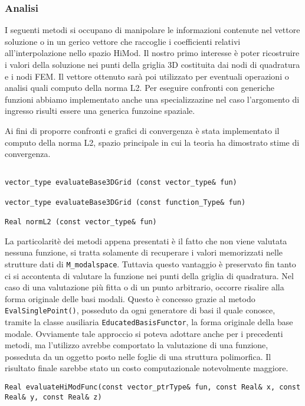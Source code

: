 \subsubsection{Analisi}

I seguenti metodi si occupano di manipolare le informazioni contenute nel vettore soluzione o in un gerico vettore che raccoglie i coefficienti relativi all'interpolazione nello spazio HiMod. Il nostro primo interesse \`e poter ricostruire i valori della soluzione nei punti della griglia 3D costituita dai nodi di quadratura e i nodi FEM. Il vettore ottenuto sar\`a poi utilizzato per eventuali operazioni o analisi quali computo della norma L2.
Per eseguire confronti con generiche funzioni abbiamo implementato anche una specializzazine nel caso l'argomento di ingresso risulti essere una generica funzoine spaziale.

Ai fini di proporre confronti e grafici di convergenza \`e stata implementato il computo della norma L2, spazio principale in cui la teoria ha dimostrato stime di convergenza.

\begin{lstlisting}[style = general,frame=none]

vector_type evaluateBase3DGrid (const vector_type& fun)

vector_type evaluateBase3DGrid (const function_Type& fun)

Real normL2 (const vector_type& fun)

\end{lstlisting}

La particolarit\`e dei metodi appena presentati \`e il fatto che non viene valutata nessuna funzione, si tratta solamente di recuperare i valori memorizzati nelle strutture dati di \texttt{M\_modalspace}. Tuttavia questo vantaggio \`e preservato fin tanto ci si accontenta di valutare la funzione nei punti della griglia di quadratura. Nel caso di una valutazione pi\`u fitta o di un punto arbitrario, occorre risalire alla forma originale delle basi modali. Questo \`e concesso grazie al metodo \texttt{EvalSinglePoint()}, posseduto da ogni generatore di basi il quale conosce, tramite la classe ausiliaria  \texttt{EducatedBasisFunctor}, la forma originale della base modale. Ovviamente tale approccio si poteva adottare anche per i precedenti metodi, ma l'utilizzo avrebbe comportato la valutazione di una funzione, posseduta da un oggetto posto nelle foglie di una struttura polimorfica. Il risultato finale sarebbe stato un costo computazionale notevolmente maggiore.
\begin{lstlisting}[style = general, frame = none]
Real evaluateHiModFunc(const vector_ptrType& fun, const Real& x, const Real& y, const Real& z)
\end{lstlisting}



